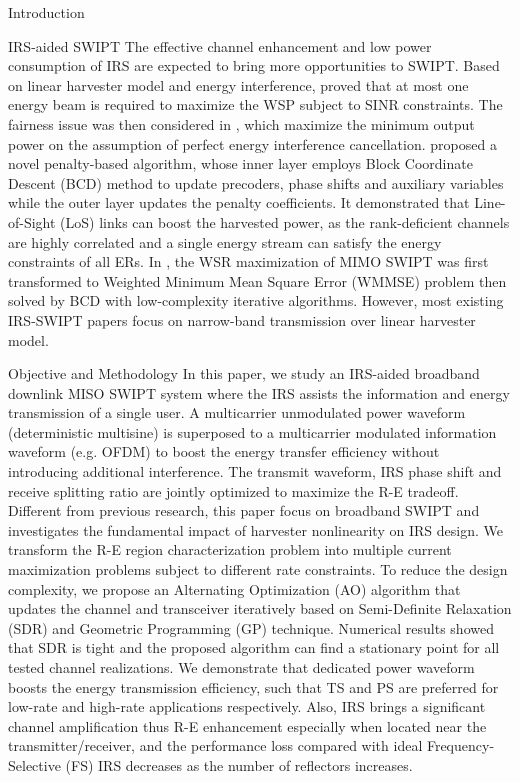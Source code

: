 \documentclass{IEEEtran}
\begin{document}
\begin{section}{Introduction}
	\begin{subsection}{IRS-aided SWIPT}
		The effective channel enhancement and low power consumption of IRS are expected to bring more opportunities to SWIPT. Based on linear harvester model and energy interference, \cite{Wu2019b} proved that at most one energy beam is required to maximize the WSP subject to SINR constraints. The fairness issue was then considered in \cite{Tang2019}, which maximize the minimum output power on the assumption of perfect energy interference cancellation. \cite{Wu2019c} proposed a novel penalty-based algorithm, whose inner layer employs Block Coordinate Descent (BCD) method to update precoders, phase shifts and auxiliary variables while the outer layer updates the penalty coefficients. It demonstrated that Line-of-Sight (LoS) links can boost the harvested power, as the rank-deficient channels are highly correlated and a single energy stream can satisfy the energy constraints of all ERs. In \cite{Pan2019a}, the WSR maximization of MIMO SWIPT was first transformed to Weighted Minimum Mean Square Error (WMMSE) problem then solved by BCD with low-complexity iterative algorithms. However, most existing IRS-SWIPT papers focus on narrow-band transmission over linear harvester model.
	\end{subsection}

	\begin{subsection}{Objective and Methodology}
		In this paper, we study an IRS-aided broadband downlink MISO SWIPT system where the IRS assists the information and energy transmission of a single user. A multicarrier unmodulated power waveform (deterministic multisine) is superposed to a multicarrier modulated information waveform (e.g. OFDM) to boost the energy transfer efficiency without introducing additional interference. The transmit waveform, IRS phase shift and receive splitting ratio are jointly optimized to maximize the R-E tradeoff. Different from previous research, this paper focus on broadband SWIPT and investigates the fundamental impact of harvester nonlinearity on IRS design. We transform the R-E region characterization problem into multiple current maximization problems subject to different rate constraints. To reduce the design complexity, we propose an Alternating Optimization (AO) algorithm that updates the channel and transceiver iteratively based on Semi-Definite Relaxation (SDR) and Geometric Programming (GP) technique. Numerical results showed that SDR is tight and the proposed algorithm can find a stationary point for all tested channel realizations. We demonstrate that dedicated power waveform boosts the energy transmission efficiency, such that TS and PS are preferred for low-rate and high-rate applications respectively. Also, IRS brings a significant channel amplification thus R-E enhancement especially when located near the transmitter/receiver, and the performance loss compared with ideal Frequency-Selective (FS) IRS decreases as the number of reflectors increases.
	\end{subsection}
\end{section}
\end{document}
